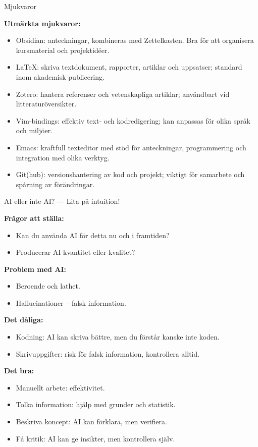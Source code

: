 \documentclass[presentation]{beamer}
\begin{document}
\begin{frame}{Mjukvaror}

  \textbf{Utmärkta mjukvaror:}
  \begin{itemize}
\item Obsidian: anteckningar, kombineras med Zettelkasten. Bra för att organisera kursmaterial och projektidéer.
\item LaTeX: skriva textdokument, rapporter, artiklar och uppsatser; standard inom akademisk publicering.
\item Zotero: hantera referenser och vetenskapliga artiklar; användbart vid litteraturöversikter.
\item Vim-bindings: effektiv text- och kodredigering; kan anpassas för olika språk och miljöer.
\item Emacs: kraftfull texteditor med stöd för anteckningar, programmering och integration med olika verktyg.
\item Git(hub): versionshantering av kod och projekt; viktigt för samarbete och spårning av förändringar.

  \end{itemize}
\end{frame}

\begin{frame}{AI eller inte AI? --- Lita på intuition!}

  \textbf{Frågor att ställa:}
  \begin{itemize}
    \item Kan du använda AI för detta nu och i framtiden?
    \item Producerar AI kvantitet eller kvalitet?
  \end{itemize}

  \textbf{Problem med AI:}
  \begin{itemize}
    \item Beroende och lathet.
    \item Hallucinationer – falsk information.
  \end{itemize}

  \textbf{Det dåliga:}
  \begin{itemize}
    \item Kodning: AI kan skriva bättre, men du förstår kanske inte koden.
    \item Skrivuppgifter: risk för falsk information, kontrollera alltid.
  \end{itemize}

  \textbf{Det bra:}
  \begin{itemize}
    \item Manuellt arbete: effektivitet.
    \item Tolka information: hjälp med grunder och statistik.
    \item Beskriva koncept: AI kan förklara, men verifiera.
    \item Få kritik: AI kan ge insikter, men kontrollera själv.
  \end{itemize}
\end{frame}
\end{document}
